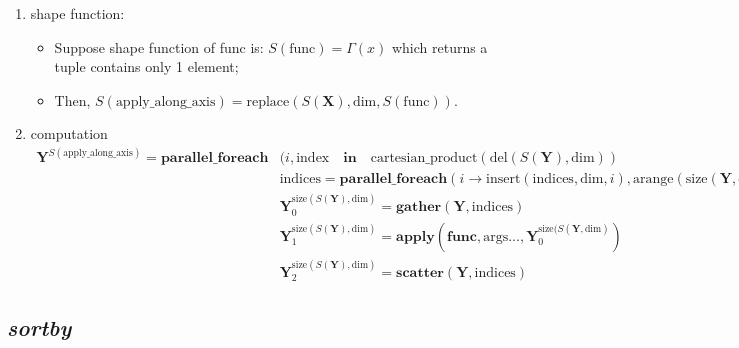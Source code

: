 \begin{enumerate}
  \item shape function:
  \begin{itemize}
    \item Suppose shape function of func is: $S(\text{func}) = \Gamma(x)$ which returns a tuple contains only 1 element;
    \item Then, $S(\text{apply\_along\_axis}) = \text{replace}(S(\mathbf{X}), \text{dim}, S(\text{func}))$.
  \end{itemize}

  \item computation
  \begin{equation*}
    \begin{aligned}
      \mathbf{Y}^{S(\text{apply\_along\_axis})} = \textbf{parallel\_foreach}& (i, \text{index} \quad \textbf{in} \quad \text{cartesian\_product}(\text{del}(S(\mathbf{Y}), \text{dim})) \\
      & \text{indices} = \textbf{parallel\_foreach}(i \rightarrow \text{insert}(\text{indices}, \text{dim}, i), \text{arange}(\text{size}(\mathbf{Y}, \text{dim}))) \\
      & \mathbf{Y}_0^{\text{size}(S(\mathbf{Y}), \text{dim})} = \textbf{gather}(\mathbf{Y}, \text{indices}) \\
      & \mathbf{Y}_1^{\text{size}(S(\mathbf{Y}), \text{dim})} = \textbf{apply}(\textbf{func}, \text{args}..., \mathbf{Y}_0^{\text{size}(S(\mathbf{Y}, \text{dim})}) \\
      & \mathbf{Y}_2^{\text{size}(S(\mathbf{Y}), \text{dim})} = \textbf{scatter}(\mathbf{Y}, \text{indices})
    \end{aligned}
  \end{equation*}
\end{enumerate}

\subsection{\textbf{\textit{sortby}}}
